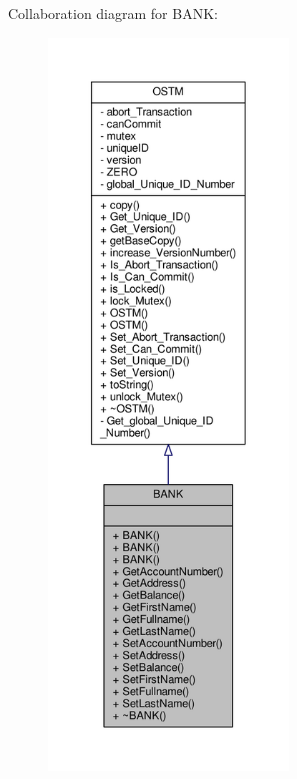 Collaboration diagram for B\+A\+NK\+:\nopagebreak
\begin{figure}[H]
\begin{center}
\leavevmode
\includegraphics[height=550pt]{class_b_a_n_k__coll__graph}
\end{center}
\end{figure}
